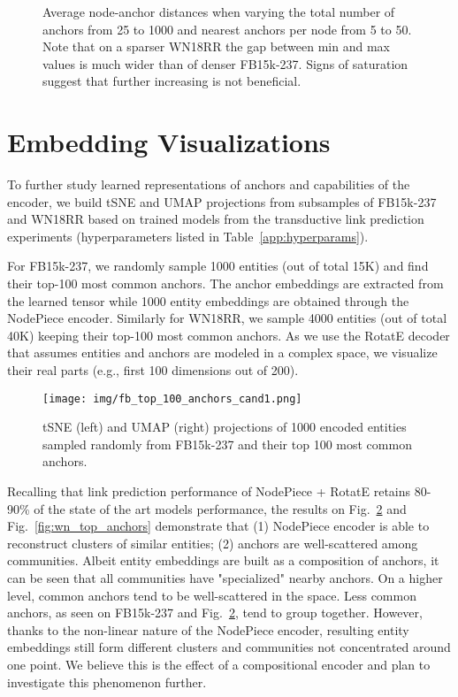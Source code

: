 \documentclass{article} \usepackage{iclr2022_conference,times}
\begin{document}
\begin{figure}[!h]\centering
    \caption{Average node-anchor distances when varying the total number of anchors  from 25 to 1000 and  nearest anchors per node from 5 to 50. Note that on a sparser WN18RR the gap between min and max values is much wider than of denser FB15k-237. Signs of saturation suggest that further increasing  is not beneficial. }\label{fig:app_distances}\end{figure}

\section{Embedding Visualizations}
\label{app:umap}

To further study learned representations of anchors and capabilities of the encoder, we build tSNE and UMAP projections from subsamples of FB15k-237 and WN18RR based on trained models from the transductive link prediction experiments (hyperparameters listed in Table~\ref{app:hyperparams}). 

For FB15k-237, we randomly sample 1000 entities (out of total 15K) and find their top-100 most common anchors. The anchor embeddings are extracted from the learned tensor while 1000 entity embeddings are obtained through the NodePiece encoder. 
Similarly for WN18RR, we sample 4000 entities (out of total 40K) keeping their top-100 most common anchors. As we use the RotatE decoder that assumes entities and anchors are modeled in a complex space, we visualize their real parts (e.g., first 100 dimensions out of 200).

\begin{figure}[!htb]
    \centering
    \texttt{[image: img/fb\_top\_100\_anchors\_cand1.png]}
    \caption{tSNE (left) and UMAP (right) projections of 1000 encoded entities sampled randomly from FB15k-237 and their top 100 most common anchors.}
    \label{fig:fb_top_anchors}
\end{figure}

Recalling that link prediction performance of NodePiece + RotatE retains 80-90\% of the state of the art models performance, the results on Fig.~\ref{fig:fb_top_anchors} and Fig.~\ref{fig:wn_top_anchors} demonstrate that (1) NodePiece encoder is able to reconstruct clusters of similar entities; (2) anchors are well-scattered among communities. 
Albeit entity embeddings are built as a composition of  anchors, it can be seen that all communities have "specialized" nearby anchors. On a higher level, common anchors tend to be well-scattered in the space.
Less common anchors, as seen on FB15k-237 and Fig.~\ref{fig:fb_top_anchors}, tend to group together. However, thanks to the non-linear nature of the NodePiece encoder, resulting entity embeddings still form different clusters and communities not concentrated around one point.
We believe this is the effect of a compositional encoder and plan to investigate this phenomenon further.
\end{document}
